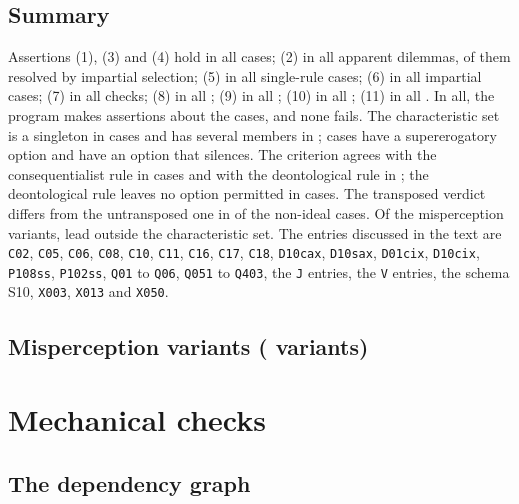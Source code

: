 \documentclass{situationist-preprint}
\begin{document}
\subsection*{Summary}

Assertions (1), (3) and (4) hold in all \stncases{} cases; (2) in all \stnad{} apparent dilemmas, \stnlot{} of them resolved by impartial selection; (5) in all \stnsingle{} single-rule cases; (6) in all \stnweak{} impartial cases; (7) in all \stndrt{} checks; (8) in all \stneth{}; (9) in all \stnethfifteen{}; (10) in all \stnetheighteen{}; (11) in all \stntransp{}. In all, the program makes \stnchecks{} assertions about the cases, and none fails. The characteristic set is a singleton in \stnunique{} cases and has several members in \stnlatitude{}; \stnsup{} cases have a supererogatory option and \stnsil{} have an option that silences. The criterion agrees with the consequentialist rule in \stnconsagree{} cases and with the deontological rule in \stndeoagree{}; the deontological rule leaves no option permitted in \stndeodilemma{} cases. The transposed verdict differs from the untransposed one in \stnnaivediff{} of the \stnnonideal{} non-ideal cases. Of the \stnmis{} misperception variants, \stnmisout{} lead outside the characteristic set. The entries discussed in the text are \texttt{C02}, \texttt{C05}, \texttt{C06}, \texttt{C08}, \texttt{C10}, \texttt{C11}, \texttt{C16}, \texttt{C17}, \texttt{C18}, \texttt{D10cax}, \texttt{D10sax}, \texttt{D01cix}, \texttt{D10cix}, \texttt{P108ss}, \texttt{P102ss}, \texttt{Q01} to \texttt{Q06}, \texttt{Q051} to \texttt{Q403}, the \texttt{J} entries, the \texttt{V} entries, the schema S10, \texttt{X003}, \texttt{X013} and \texttt{X050}.



\subsection*{Misperception variants (\stnmis{} variants)}


\clearpage
\section{Mechanical checks}\label{s:appC}

\subsection*{The dependency graph}
\end{document}
